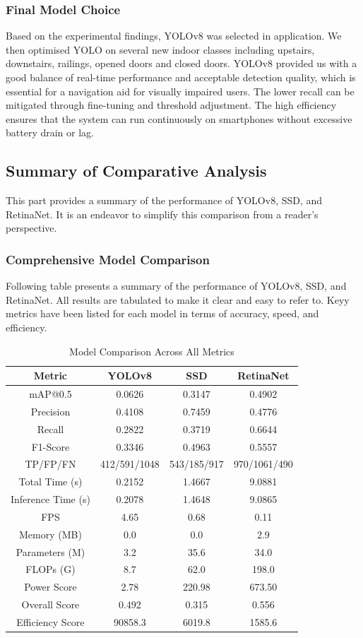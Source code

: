 \documentclass{FastFyp}
\begin{document}
\subsubsection{Final Model Choice}

Based on the experimental findings, YOLOv8 was selected in application. We then optimised YOLO on several new indoor classes including upstairs, downstairs, railings, opened doors and closed doors. YOLOv8 provided us with a good balance of real-time performance and acceptable detection quality, which is essential for a navigation aid for visually impaired users. The lower recall can be mitigated through fine-tuning and threshold adjustment. The high efficiency ensures that the system can run continuously on smartphones without excessive battery drain or lag.

\subsection{Summary of Comparative Analysis}
This part provides a summary of the performance of YOLOv8, SSD, and RetinaNet. It is an endeavor to simplify this comparison from a reader's perspective.

\subsubsection{Comprehensive Model Comparison}
Following table presents a summary of the performance of YOLOv8, SSD, and RetinaNet. All results are tabulated to make it clear and easy to refer to. Keyy metrics have been listed for each model in terms of accuracy, speed, and efficiency.
\begin{table}[h!]
\centering
\caption{Model Comparison Across All Metrics}
\begin{tabular}{|c|c|c|c|}
\hline
\textbf{Metric} & \textbf{YOLOv8} & \textbf{SSD} & \textbf{RetinaNet} \\
\hline
mAP@0.5 & 0.0626 & 0.3147 & 0.4902 \\
\hline
Precision & 0.4108 & 0.7459 & 0.4776 \\
\hline
Recall & 0.2822 & 0.3719 & 0.6644 \\
\hline
F1-Score & 0.3346 & 0.4963 & 0.5557 \\
\hline
TP/FP/FN & 412/591/1048 & 543/185/917 & 970/1061/490 \\
\hline
Total Time (s) & 0.2152 & 1.4667 & 9.0881 \\
\hline
Inference Time (s) & 0.2078 & 1.4648 & 9.0865 \\
\hline
FPS & 4.65 & 0.68 & 0.11 \\
\hline
Memory (MB) & 0.0 & 0.0 & 2.9 \\
\hline
Parameters (M) & 3.2 & 35.6 & 34.0 \\
\hline
FLOPs (G) & 8.7 & 62.0 & 198.0 \\
\hline
Power Score & 2.78 & 220.98 & 673.50 \\
\hline
Overall Score & 0.492 & 0.315 & 0.556 \\
\hline
Efficiency Score & 90858.3 & 6019.8 & 1585.6 \\
\hline
\end{tabular}
\end{table}
\end{document}

